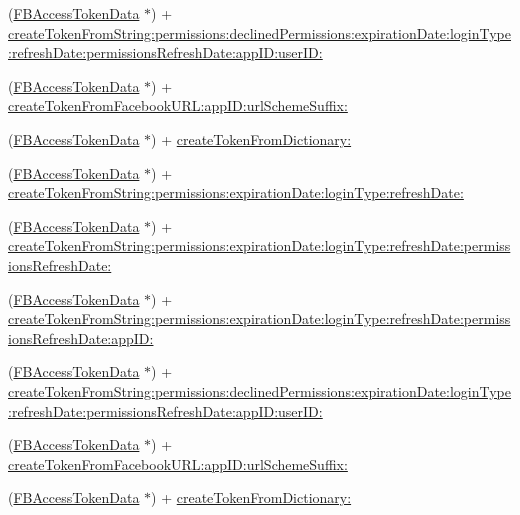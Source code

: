 \begin{DoxyCompactItemize}
\item 
(\hyperlink{interfaceFBAccessTokenData}{F\+B\+Access\+Token\+Data} $\ast$) + \hyperlink{interfaceFBAccessTokenData_a9acd1b715ed1dc4b9c8d7b339eca2ab2}{create\+Token\+From\+String\+:permissions\+:declined\+Permissions\+:expiration\+Date\+:login\+Type\+:refresh\+Date\+:permissions\+Refresh\+Date\+:app\+I\+D\+:user\+I\+D\+:}
\item 
(\hyperlink{interfaceFBAccessTokenData}{F\+B\+Access\+Token\+Data} $\ast$) + \hyperlink{interfaceFBAccessTokenData_a3c27c994504eb470de2aa02ce71ab3d5}{create\+Token\+From\+Facebook\+U\+R\+L\+:app\+I\+D\+:url\+Scheme\+Suffix\+:}
\item 
(\hyperlink{interfaceFBAccessTokenData}{F\+B\+Access\+Token\+Data} $\ast$) + \hyperlink{interfaceFBAccessTokenData_a0a756bdb60ce1b81cd4dbc61943315a9}{create\+Token\+From\+Dictionary\+:}
\item 
(\hyperlink{interfaceFBAccessTokenData}{F\+B\+Access\+Token\+Data} $\ast$) + \hyperlink{interfaceFBAccessTokenData_af4dd1baa0412b64f5234595a50db223d}{create\+Token\+From\+String\+:permissions\+:expiration\+Date\+:login\+Type\+:refresh\+Date\+:}
\item 
(\hyperlink{interfaceFBAccessTokenData}{F\+B\+Access\+Token\+Data} $\ast$) + \hyperlink{interfaceFBAccessTokenData_ae197e866e84fdbfde1d66b936f0dcc90}{create\+Token\+From\+String\+:permissions\+:expiration\+Date\+:login\+Type\+:refresh\+Date\+:permissions\+Refresh\+Date\+:}
\item 
(\hyperlink{interfaceFBAccessTokenData}{F\+B\+Access\+Token\+Data} $\ast$) + \hyperlink{interfaceFBAccessTokenData_af4e6f1dc14436e143c86c4490c79f4c8}{create\+Token\+From\+String\+:permissions\+:expiration\+Date\+:login\+Type\+:refresh\+Date\+:permissions\+Refresh\+Date\+:app\+I\+D\+:}
\item 
(\hyperlink{interfaceFBAccessTokenData}{F\+B\+Access\+Token\+Data} $\ast$) + \hyperlink{interfaceFBAccessTokenData_a9acd1b715ed1dc4b9c8d7b339eca2ab2}{create\+Token\+From\+String\+:permissions\+:declined\+Permissions\+:expiration\+Date\+:login\+Type\+:refresh\+Date\+:permissions\+Refresh\+Date\+:app\+I\+D\+:user\+I\+D\+:}
\item 
(\hyperlink{interfaceFBAccessTokenData}{F\+B\+Access\+Token\+Data} $\ast$) + \hyperlink{interfaceFBAccessTokenData_a3c27c994504eb470de2aa02ce71ab3d5}{create\+Token\+From\+Facebook\+U\+R\+L\+:app\+I\+D\+:url\+Scheme\+Suffix\+:}
\item 
(\hyperlink{interfaceFBAccessTokenData}{F\+B\+Access\+Token\+Data} $\ast$) + \hyperlink{interfaceFBAccessTokenData_a0a756bdb60ce1b81cd4dbc61943315a9}{create\+Token\+From\+Dictionary\+:}

\end{DoxyCompactItemize}
